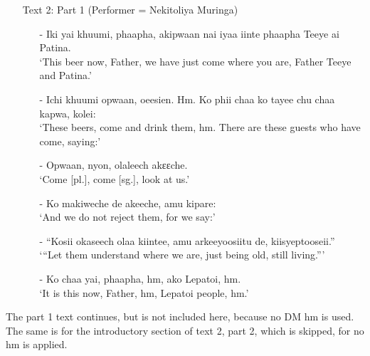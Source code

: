 \documentclass[output=paper,colorlinks,citecolor=brown]{langscibook}
\begin{document}
\begin{enumerate}
    \item[]     Text 2: Part 1 (Performer = Nekitoliya Muringa)
    \begin{enumerate}
        \item[-]    Iki yai khuumi, phaapha, akipwaan nai iyaa iinte phaapha Teeye ai Patina.\\ 
                    `This beer now, Father, we have just come where you are, Father Teeye and Patina.'
        \item[-]    Ichi khuumi opwaan, oeesien. Hm. Ko phii chaa ko tayee chu chaa kapwa, kolei:\\
                    `These beers, come and drink them, hm. There are these guests who have come, saying:'
        \item[-]    Opwaan, nyon, olaleech akɛɛche.\\
                    `Come [pl.], come [sg.], look at us.'
        \item[-]    Ko makiweche de akeeche, amu kipare:\\
                    `And we do not reject them, for we say:'
        \item[-]    “Kosii okaseech olaa kiintee, amu arkeeyoosiitu de, kiisyeptooseii.”\\
                    `“Let them understand where we are, just being old, still living.”'
        \item[-]    Ko chaa yai, phaapha, hm, ako Lepatoi, hm.\\
                    `It is this now, Father, hm, Lepatoi people, hm.'
    \end{enumerate}
\end{enumerate}


The part 1 text continues, but is not included here, because no DM hm is used. The same is for the introductory section of text 2, part 2, which is skipped, for no hm is applied.

\end{document}
